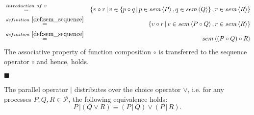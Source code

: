 \begin{myproof}
\begin{eqnarray*}
  & \overset{introduction \ of \ v}{=} & \left\{ v \circ r \,|\, v \in \left\{ p \circ q \,|\, p \in sem \left\langle P \right\rangle, q \in sem \left\langle Q \right\rangle \right\}, r \in sem \left\langle R \right\rangle \right\} \\
  & \overset{\defref{def:sem_sequence}}{=} & \left\{ v \circ r \,|\, v \in sem \left\langle P \circ Q \right\rangle, r \in sem \left\langle R \right\rangle \right\} \\
  & \overset{\defref{def:sem_sequence}}{=} & sem \left\langle \left( P \circ Q \right) \circ R \right\rangle
\end{eqnarray*}
The associative property of function composition $\circ$ is transferred to the sequence operator $\circ$ and hence,  holds.

\hfill$\blacksquare$
\end{myproof}

\begin{theorem}
\label{thm:distributivity_parallel_choice}
The parallel operator $|$ distributes over the choice operator $\vee$, i.e. for any processes $P, Q, R \in \mathcal{P}$, the following equivalence holds:
\begin{equation*}
  P \,| \left( Q \vee R \right) \equiv \left( P \,|\, Q \right) \vee \left( P \,|\, R \right).
\end{equation*}
\end{theorem}

